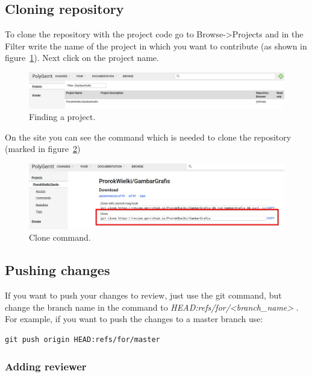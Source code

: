 \documentclass{article}
\begin{document}
\subsection{Cloning repository}

To clone the repository with the project code go to Browse->Projects and in the Filter write the name of the project in which you want to contribute (as shown in figure~\ref{fig:FindProject}). Next click on the project name.

\begin{figure}[!ht]
  \centering
  \includegraphics[width=.75\textwidth]{img/FindProject}
  \caption{Finding a project.}
  \label{fig:FindProject}
\end{figure}

On the site you can see the command which is needed to clone the repository (marked in figure~\ref{fig:Clone})

\begin{figure}[!ht]
  \centering
  \includegraphics[width=.75\textwidth]{img/Clone}
  \caption{Clone command.}
  \label{fig:Clone}
\end{figure}

\subsection{Pushing changes}

If you want to push your changes to review, just use the git command, but change the branch name in the command to \textit{HEAD:refs/for/<branch\_name>} . For example, if you want to push the changes to a master branch use: 

\begin{lstlisting}
git push origin HEAD:refs/for/master
\end{lstlisting}

\subsubsection{Adding reviewer}
\end{document}
